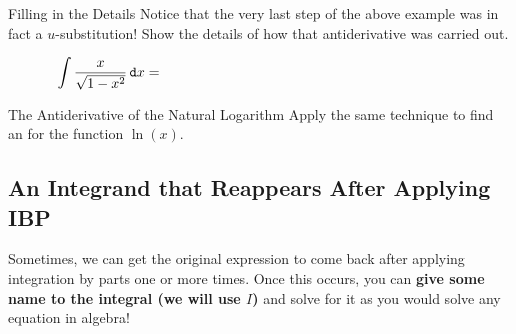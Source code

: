 \begin{exercise}{Filling in the Details \Coffeecup \Coffeecup}
Notice that the very last step of the above example was in fact a $u$-substitution!  Show the details of how that antiderivative was carried out.

$$\int \frac{x}{\sqrt{1-x^2}}\dif x =\hspace{3in}$$
\end{exercise}

\begin{exercise}{The Antiderivative of the Natural Logarithm \Coffeecup \Coffeecup}
Apply the same technique to find an  for the function $\ln(x)$.
\end{exercise}

\subsection{An Integrand that Reappears After Applying IBP}\label{reappear} Sometimes, we can get the original expression to come back after applying integration by parts one or more times.  Once this occurs, you can {\bf give some name to the integral (we will use $I$)} and solve for it as you would solve any equation in algebra!

